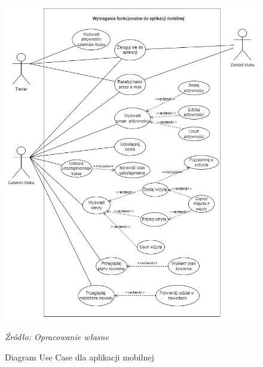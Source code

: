 \documentclass[12pt,twoside]{report}
\begin{document}
\begin{figure}[H]
	\centering
	\includegraphics[scale=0.6]{UseCaseMobile}
	\caption{Diagram Use Case dla aplikacji mobilnej}
	\textit{Źródło: Opracowanie własne}
	\label{UseCaseMobile}
\end{figure}
\newpage
\end{document}
